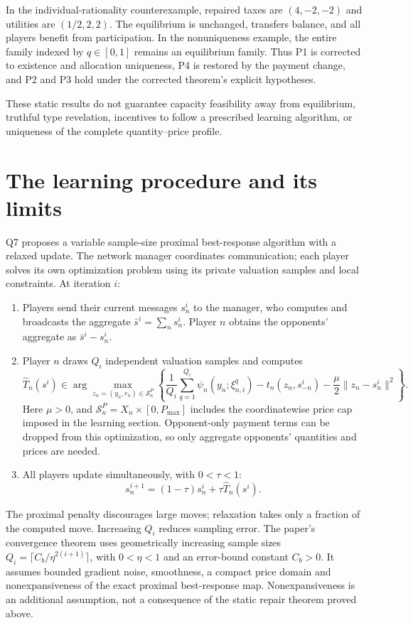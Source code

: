 \documentclass[11pt]{article}
\begin{document}
In the individual-rationality counterexample, repaired taxes are $(4,-2,-2)$ and utilities
are $(1/2,2,2)$. The equilibrium is unchanged, transfers balance, and
all players benefit from participation. In the nonuniqueness example,
the entire family indexed by $q\in[0,1]$ remains an equilibrium family.
Thus P1 is corrected to existence and allocation uniqueness, P4 is
restored by the payment change, and P2 and P3 hold under the corrected
theorem's explicit hypotheses.

These static results do not
guarantee capacity feasibility away from equilibrium, truthful type
revelation, incentives to follow a prescribed learning algorithm, or
uniqueness of the complete quantity--price profile.

\section{The learning procedure and its limits}
Q7 proposes a variable sample-size proximal best-response algorithm with
a relaxed update. The network manager coordinates communication; each
player solves its own optimization problem using its private valuation
samples and local constraints. At iteration $i$:
\begin{enumerate}
\item Players send their current messages $s_n^i$ to the manager, who
computes and broadcasts the aggregate $\bar s^i=\sum_n s_n^i$.
Player $n$ obtains the opponents' aggregate as $\bar s^i-s_n^i$.
\item Player $n$ draws $Q_i$ independent valuation samples and computes
\[
 \widehat T_n(s^i)\in\arg\max_{z_n=(y_n,r_n)\in\mathcal S_n^P}
 \left\{\frac1{Q_i}\sum_{q=1}^{Q_i}\psi_n(y_n;\xi_{n,i}^q)
 -t_n(z_n,s_{-n}^i)-\frac\mu2\|z_n-s_n^i\|^2\right\}.
\]
Here $\mu>0$, and $\mathcal S_n^P=X_n\times[0,P_{\max}]$ includes
the coordinatewise price cap imposed in the learning section.
Opponent-only payment terms can be dropped from this optimization,
so only aggregate opponents' quantities and prices are needed.
\item All players update simultaneously, with $0<\tau<1$:
\[
 s_n^{i+1}=(1-\tau)s_n^i+\tau\widehat T_n(s^i).
\]
\end{enumerate}
The proximal penalty discourages large moves; relaxation takes only a
fraction of the computed move. Increasing $Q_i$ reduces sampling error.
The paper's convergence theorem uses geometrically increasing sample
sizes $Q_i=\lceil C_b/\eta^{2(i+1)}\rceil$, with $0<\eta<1$ and
an error-bound constant $C_b>0$. It assumes bounded gradient noise,
smoothness, a compact price domain and nonexpansiveness of the exact
proximal best-response map. Nonexpansiveness is an additional assumption,
not a consequence of the static repair theorem proved above.
\end{document}
